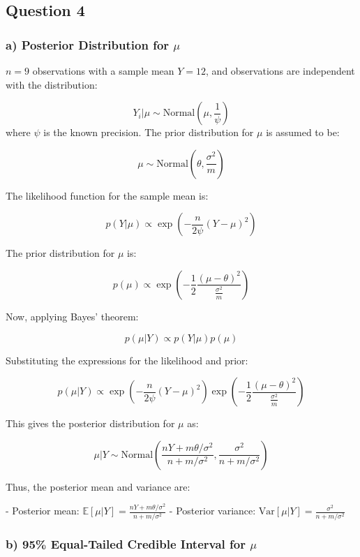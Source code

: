 \documentclass{article}
\begin{document}
\subsection*{Question 4}

\subsubsection*{a) Posterior Distribution for \( \mu \)}

\( n = 9 \) observations with a sample mean \( Y = 12 \), and observations are independent with the distribution:

\[
Y_i | \mu \sim \text{Normal}(\mu, \frac{1}{\psi})
\]
where \( \psi \) is the known precision. The prior distribution for \( \mu \) is assumed to be:

\[
\mu \sim \text{Normal}(\theta, \frac{\sigma^2}{m})
\]

The likelihood function for the sample mean is:

\[
p(Y | \mu) \propto \exp \left( - \frac{n}{2\psi} (Y - \mu)^2 \right)
\]

The prior distribution for \( \mu \) is:

\[
p(\mu) \propto \exp \left( - \frac{1}{2} \frac{(\mu - \theta)^2}{\frac{\sigma^2}{m}} \right)
\]

Now, applying Bayes' theorem:

\[
p(\mu | Y) \propto p(Y | \mu) p(\mu)
\]

Substituting the expressions for the likelihood and prior:

\[
p(\mu | Y) \propto \exp \left( - \frac{n}{2\psi} (Y - \mu)^2 \right) \exp \left( - \frac{1}{2} \frac{(\mu - \theta)^2}{\frac{\sigma^2}{m}} \right)
\]

This gives the posterior distribution for \( \mu \) as:

\[
\mu | Y \sim \text{Normal} \left( \frac{nY + m\theta / \sigma^2}{n + m / \sigma^2}, \frac{\sigma^2}{n + m / \sigma^2} \right)
\]

Thus, the posterior mean and variance are:

- Posterior mean: \( \mathbb{E}[\mu | Y] = \frac{nY + m\theta / \sigma^2}{n + m / \sigma^2} \)
- Posterior variance: \( \text{Var}[\mu | Y] = \frac{\sigma^2}{n + m / \sigma^2} \)

\subsubsection*{b) 95\% Equal-Tailed Credible Interval for \( \mu \)}
\end{document}

